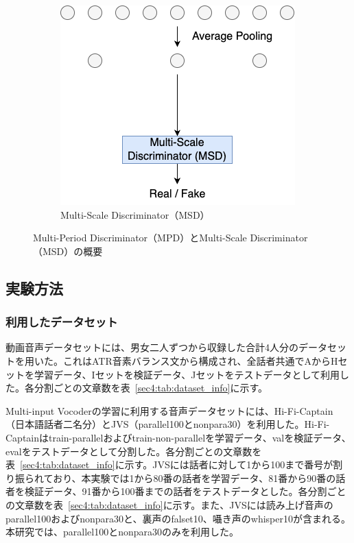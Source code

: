 \documentclass[12pt]{jarticle}
\numberwithin{equation}{section}    %
\numberwithin{figure}{section}      %
\numberwithin{table}{section}      %
\begin{document}
\begin{figure}[bt]
\begin{subfigure}{0.45\textwidth}
        \includegraphics[width=\linewidth]{./figure/sec4/model/msd.png}
        \caption{Multi-Scale Discriminator（MSD）}
        \label{sec4:fig:multi-input_vocoder_msd}
    \end{subfigure}
    \caption{Multi-Period Discriminator（MPD）とMulti-Scale Discriminator（MSD）の概要}
    \label{sec4:fig:multi-input_vocoder_mpd_msd}
\end{figure}

\subsection{実験方法}
\subsubsection{利用したデータセット}
動画音声データセットには、男女二人ずつから収録した合計4人分のデータセット\cite{taguchi,esaki}を用いた。これはATR音素バランス文\cite{atr}から構成され、全話者共通でAからHセットを学習データ、Iセットを検証データ、Jセットをテストデータとして利用した。各分割ごとの文章数を表~\ref{sec4:tab:dataset_info}に示す。

Multi-input Vocoderの学習に利用する音声データセットには、Hi-Fi-Captain（日本語話者二名分）\cite{okamoto2023hi}とJVS（parallel100とnonpara30）\cite{takamichi2019jvs}を利用した。Hi-Fi-Captainはtrain-parallelおよびtrain-non-parallelを学習データ、valを検証データ、evalをテストデータとして分割した。各分割ごとの文章数を表~\ref{sec4:tab:dataset_info}に示す。JVSには話者に対して1から100まで番号が割り振られており、本実験では1から80番の話者を学習データ、81番から90番の話者を検証データ、91番から100番までの話者をテストデータとした。各分割ごとの文章数を表~\ref{sec4:tab:dataset_info}に示す。また、JVSには読み上げ音声のparallel100およびnonpara30と、裏声のfalset10、囁き声のwhisper10が含まれる。本研究では、parallel100とnonpara30のみを利用した。
\end{document}
